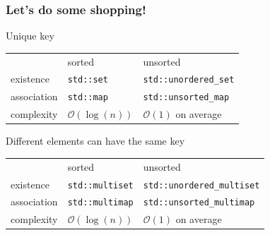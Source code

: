 \documentclass[10pt,svgnames,usenames,table]{beamer} %
\newcommand{\bigoh}{\mathcal{O}}
\begin{document}
\begin{frame}
  \frametitle{Let's do some shopping!}
  \begin{block}{Unique key}
    \begin{center}
      \begin{tabular}{lll}
        & sorted & unsorted\\
        existence & \lstinline|std::set| & \lstinline|std::unordered_set|\\
        association & \lstinline|std::map| & \lstinline|std::unsorted_map|\\
        complexity & $\bigoh(\log(n))$ & $\bigoh(1)$ on average
      \end{tabular}
    \end{center}
  \end{block}
  \begin{block}{Different elements can have the same key}
    \begin{center}
      \begin{tabular}{lll}
        & sorted & unsorted\\
        existence & \lstinline|std::multiset| & \lstinline|std::unordered_multiset|\\
        association & \lstinline|std::multimap| & \lstinline|std::unsorted_multimap|\\
        complexity & $\bigoh(\log(n))$ & $\bigoh(1)$ on average
      \end{tabular}
    \end{center}
  \end{block}
\end{frame}
\end{document}
